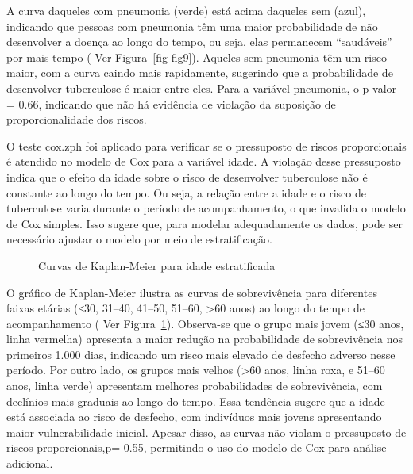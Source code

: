 \documentclass[
  letterpaper,
  DIV=11,
  numbers=noendperiod]{scrreprt}
\begin{document}
A curva daqueles com pneumonia (verde) está acima daqueles sem (azul),
indicando que pessoas com pneumonia têm uma maior probabilidade de não
desenvolver a doença ao longo do tempo, ou seja, elas permanecem
``saudáveis'' por mais tempo ( Ver Figura~\ref{fig-fig9}). Aqueles sem
pneumonia têm um risco maior, com a curva caindo mais rapidamente,
sugerindo que a probabilidade de desenvolver tuberculose é maior entre
eles. Para a variável pneumonia, o p-valor = 0.66, indicando que não há
evidência de violação da suposição de proporcionalidade dos riscos.

O teste cox.zph foi aplicado para verificar se o pressuposto de riscos
proporcionais é atendido no modelo de Cox para a variável idade. A
violação desse pressuposto indica que o efeito da idade sobre o risco de
desenvolver tuberculose não é constante ao longo do tempo. Ou seja, a
relação entre a idade e o risco de tuberculose varia durante o período
de acompanhamento, o que invalida o modelo de Cox simples. Isso sugere
que, para modelar adequadamente os dados, pode ser necessário ajustar o
modelo por meio de estratificação.

\begin{figure}

\caption{\label{fig-fig11}Curvas de Kaplan-Meier para idade
estratificada}


\end{figure}%

O gráfico de Kaplan-Meier ilustra as curvas de sobrevivência para
diferentes faixas etárias (≤30, 31--40, 41--50, 51--60, \textgreater60
anos) ao longo do tempo de acompanhamento ( Ver Figura~\ref{fig-fig11}).
Observa-se que o grupo mais jovem (≤30 anos, linha vermelha) apresenta a
maior redução na probabilidade de sobrevivência nos primeiros 1.000
dias, indicando um risco mais elevado de desfecho adverso nesse período.
Por outro lado, os grupos mais velhos (\textgreater60 anos, linha roxa,
e 51--60 anos, linha verde) apresentam melhores probabilidades de
sobrevivência, com declínios mais graduais ao longo do tempo. Essa
tendência sugere que a idade está associada ao risco de desfecho, com
indivíduos mais jovens apresentando maior vulnerabilidade inicial.
Apesar disso, as curvas não violam o pressuposto de riscos
proporcionais,p= 0.55, permitindo o uso do modelo de Cox para análise
adicional.
\end{document}
